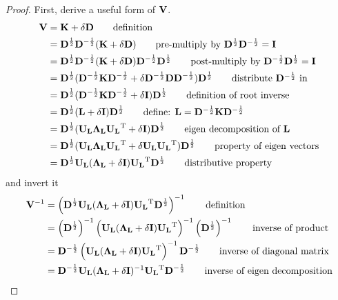 \begin{proof}
First, derive a useful form of $\mathbf{V}$.
\begin{align}
\bV &= \bK + \delta \bD   																								\tag*{definition}\\
    &= \bD\halfpow \bD\neghalfpow (\bK + \delta \bD)                                                                 	\tag*{pre-multiply by $\bD\halfpow \bD\neghalfpow = \bI$}\\
    &= \bD\halfpow \bD\neghalfpow (\bK + \delta \bD) \bD\neghalfpow \bD\halfpow 										\tag*{post-multiply by $\bD\neghalfpow \bD\halfpow = \bI$}\\
    &= \bD\halfpow(\bD\neghalfpow \bK \bD\neghalfpow + \delta \bD\neghalfpow \bD \bD\neghalfpow)\bD\halfpow 			\tag*{distribute $\bD\neghalfpow$ in}\\
    &= \bD\halfpow(\bD\neghalfpow \bK \bD\neghalfpow + \delta \bI) \bD\halfpow                                  		\tag*{definition of root inverse}\\
    &= \bD\halfpow(\bL + \delta \bI) \bD\halfpow                                                                 		\tag*{define: $\bL = \bD\neghalfpow\bK \bD\neghalfpow$}\\
    &= \bD\halfpow(\bUL \bLL \bUL \T + \delta \bI) \bD\halfpow                                                			\tag*{eigen decomposition of $\bL$}\\
    &= \bD\halfpow(\bUL \bLL \bUL \T + \delta \bUL \bUL \T)\bD\halfpow                                         			\tag*{property of eigen vectors}\\
    &= \bD\halfpow\bUL (\bLL + \delta \bI) \bUL \T \bD\halfpow                                                			\tag*{distributive property}
\end{align}
and invert it
\begin{align}
\mathbf{V}^{-1} &= \left( \mathbf{D}^{\frac{1}{2}}\mathbf{U_L} (\mathbf{\Lambda_L} + \delta \mathbf{I}) \mathbf{U_L} ^\mathrm{T} \mathbf{D}^{\frac{1}{2}} \right)^{-1}  											\tag*{definition}\\
    	&= \left( \mathbf{D}^{\frac{1}{2}} \right)^{-1} \left( \mathbf{U_L} (\mathbf{\Lambda_L} + \delta \mathbf{I}) \mathbf{U_L}^\mathrm{T} \right)^{-1} \left( \mathbf{D}^{\frac{1}{2}} \right)^{-1}     \tag*{inverse of product}\\
    	&= \mathbf{D}^{-\frac{1}{2}} \left( \mathbf{U_L} (\mathbf{\Lambda_L} + \delta \mathbf{I}) \mathbf{U_L}^\mathrm{T} \right)^{-1} \mathbf{D}^{-\frac{1}{2}}    									\tag*{inverse of diagonal matrix}\\
    	&= \mathbf{D}^{-\frac{1}{2}} \mathbf{U_L} (\mathbf{\Lambda_L} + \delta \mathbf{I})^{-1} \mathbf{U_L}^\mathrm{T}  \mathbf{D}^{-\frac{1}{2}}               									\tag*{inverse of eigen decomposition}
\end{align}

\end{proof}
